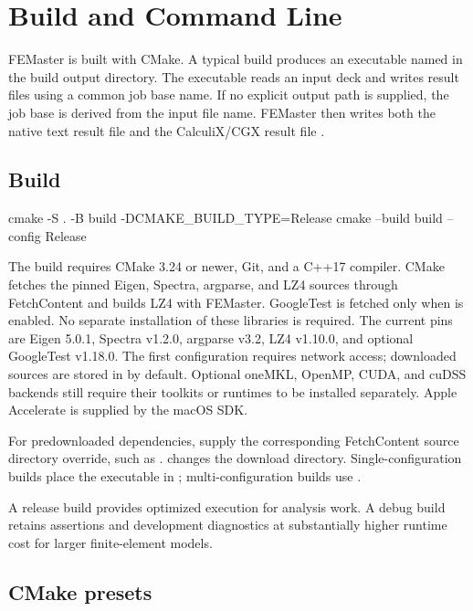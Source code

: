 \chapter{Build and Command Line}

FEMaster is built with CMake. A typical build produces an executable named  in the build output directory. The executable reads an input deck and writes result files using a common job base name. If no explicit output path is supplied, the job base is derived from the input file name. FEMaster then writes both the native text result file  and the CalculiX/CGX result file .

\section{Build}

\begin{shellcmd}
cmake -S . -B build -DCMAKE_BUILD_TYPE=Release
cmake --build build --config Release
\end{shellcmd}

The build requires CMake 3.24 or newer, Git, and a C++17 compiler. CMake fetches the pinned Eigen, Spectra, argparse, and LZ4 sources through FetchContent and builds LZ4 with FEMaster. GoogleTest is fetched only when  is enabled. No separate installation of these libraries is required. The current pins are Eigen 5.0.1, Spectra v1.2.0, argparse v3.2, LZ4 v1.10.0, and optional GoogleTest v1.18.0. The first configuration requires network access; downloaded sources are stored in  by default. Optional oneMKL, OpenMP, CUDA, and cuDSS backends still require their toolkits or runtimes to be installed separately. Apple Accelerate is supplied by the macOS SDK.

For predownloaded dependencies, supply the corresponding FetchContent source directory override, such as .  changes the download directory. Single-configuration builds place the executable in ; multi-configuration builds use .

A release build provides optimized execution for analysis work. A debug build retains assertions and development diagnostics at substantially higher runtime cost for larger finite-element models.

\section{CMake presets}

